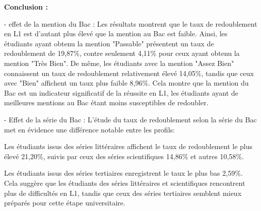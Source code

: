 \textcolor{red}{\faInfoCircle}\textbf{Conclusion :}


- effet de la mention du Bac : 
    Les résultats montrent que le taux de redoublement en L1 est d'autant plus élevé que la mention au Bac est faible. Ainsi, les étudiants ayant obtenu la mention "Passable" présentent un taux de redoublement de 19,87\%, contre seulement 4,11\% pour ceux ayant obtenu la mention "Très Bien". De même, les étudiants avec la mention "Assez Bien" connaissent un taux de redoublement relativement élevé 14,05\%, tandis que ceux avec "Bien" affichent un taux plus faible 8,96\%.
Cela montre que la mention du Bac est un indicateur significatif de la réussite en L1, les étudiants ayant de meilleures mentions au Bac étant moins susceptibles de redoubler.

- Effet de la série du Bac : 
L'étude du taux de redoublement selon la série du Bac met en évidence une différence notable entre les profils:

Les étudiants issus des séries littéraires affichent le taux de redoublement le plus élevé 21,20\%, suivis par ceux des séries scientifiques 14,86\% et autres 10,58\%.

Les étudiants issus des séries tertiaires enregistrent le taux le plus bas 2,59\%. Cela suggère que les étudiants des séries littéraires et scientifiques rencontrent plus de difficultés en L1, tandis que ceux des séries tertiaires semblent mieux préparés pour cette étape universitaire. 




